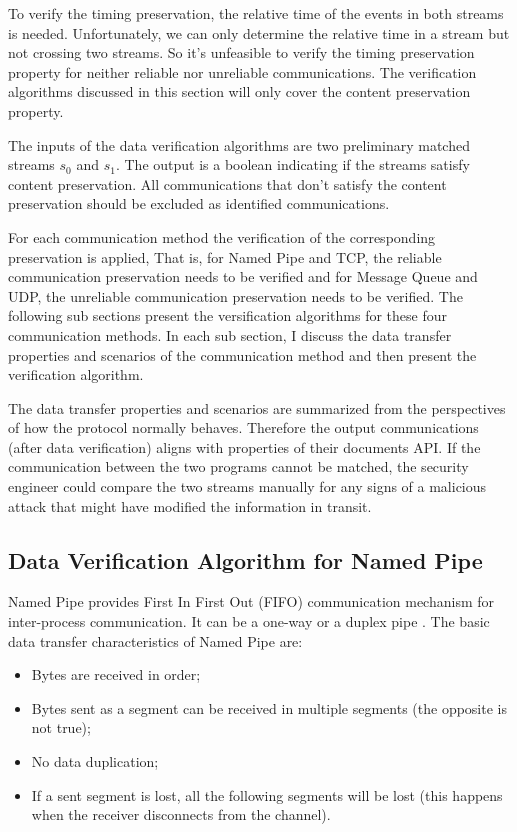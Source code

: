 To verify the timing preservation, the relative time of the events in both streams is needed. Unfortunately, we can only determine the relative time in a stream but not crossing two streams. So it's unfeasible to verify the timing preservation property for neither reliable nor unreliable communications. The verification algorithms discussed in this section will only cover the content preservation property.  

The inputs of the data verification algorithms are two preliminary matched streams $s_0$ and $s_1$. The output is a boolean indicating if the streams satisfy content preservation. All communications that don't satisfy the content preservation should be excluded as identified communications.

For each communication method the verification of the corresponding preservation is applied, That is, for Named Pipe and TCP, the reliable communication preservation needs to be verified and for Message Queue and UDP, the unreliable communication preservation needs to be verified. The following sub sections present the versification  algorithms for these four communication methods. In each sub section, I discuss the data transfer properties and scenarios of the communication method and then present the verification algorithm. 

The data transfer properties and scenarios are summarized from the perspectives of how the protocol normally behaves. Therefore the output communications (after data verification) aligns with properties of their documents API. If the communication between the two programs cannot be matched, the security engineer could compare the two streams manually for any
signs of a malicious attack that might have modified the information in transit.

\subsection{Data Verification Algorithm for Named Pipe}
Named Pipe provides First In First Out (FIFO) communication mechanism for inter-process communication. It can be a one-way or a duplex pipe \cite{WinNamedpipe}. The basic data transfer characteristics of Named Pipe are: 
\begin{itemize}
  \item Bytes are received in order;
  \item Bytes sent as a segment can be received in multiple segments (the opposite is not true);
  \item No data duplication;
  \item If a sent segment is lost, all the following segments will be lost (this happens when the receiver disconnects from the channel).
  
\end{itemize}

